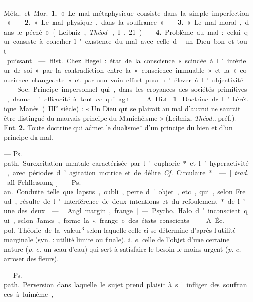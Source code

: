 \begin{itemize}[leftmargin=1cm, label=, itemsep=1pt]
 — \si{Méta.} et \si{Mor.} {\bf 1.} « Le mal
métaphysique consiste dans la simple
imperfection ». — {\bf 2.} « Le mal physique, dans la souffrance ». — {\bf 3.} « Le
mal moral, dans le péché » (Leibniz,
{\it Théod.}, I, 21). — {\bf 4.} Problème du
mal : celui qui consiste à concilier
l'existence du mal avec celle d’un
Dieu bon et tout-puissant.

 — \si{Hist.}
Chez Hegel : état de la conscience
« scindée à l'intérieur de soi » par la
contradiction entre la « conscience
immuable » et la « conscience changeante » et par son vain effort pour
s’élever à l’objectivité.

 — \si{Soc.} Principe impersonnel
qui, dans les croyances des sociétés
primitives, donne l'efficacité à tout
ce qui agit.

 — A. \si{Hist.} {\bf 1.} Doctrine
de l’hérétique Manès ({\footnotesize III}$^\text{e}$ siècle) :
« Un Dieu qui se plairait au mal
d'autrui ne saurait être distingué du
mauvais principe du Manichéisme »
(Leibniz, {\it Théod.}, préf.). — Ent. {\bf 2.}
Toute doctrine qui admet le dualisme* d’un principe du bien et
d’un principe du mal.

 — \si{Ps. path.} Surexcitation
mentale caractérisée par l'euphorie*
et l’hyperactivité, avec périodes
d’agitation motrice et de délire. {\it Cf.}
Circulaire*.

 — [{\it trad.} all. Fehlleisiung]
— \si{Ps. an.} Conduite telle que lapsus,
oubli, perte d'objet, etc., qui, selon
Freud, résulte de l'interférence de
deux intentions et du refoulement*
de l’une des deux.

 — [Angl. margin,
frange] — \si{Psycho.} Halo d’inconscient qui, selon James, forme la
« frange » des états conscients.

 — A. \si{Éc. pol.} Théorie
de la valeur$^3$ selon laquelle celle-ci
se détermine d’après l'utilité marginale (syn. : utilité limite ou finale),
{\it i. e.} celle de l’objet d'une certaine
nature ({\it p. e.} un seau d’eau) qui sert
à satisfaire le besoin le moins urgent
({\it p. e.} arroser des fleurs).

 — \si{Ps. path.} Perversion
dans laquelle le sujet prend plaisir
à s'infliger des souffrances à luimême,


\end{itemize}
